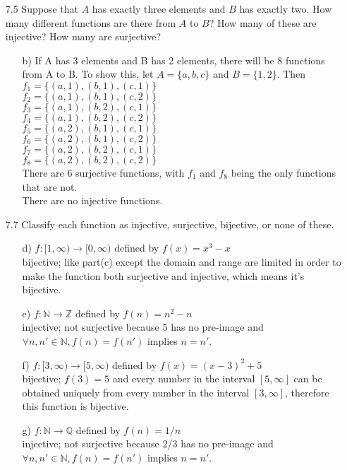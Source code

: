 \documentclass[12pt]{article}
\begin{document}
\begin{enumerate}
\item[7.5] Suppose that $A$ has exactly three elements and $B$ has exactly two. How many different functions are there from $A$ to $B$? How many of these are injective? How many are surjective?
\begin{enumerate}
\item[b)] If A has 3 elements and B has 2 elements, there will be 8 functions from A to B.
To show this, let $A = \{a, b, c\}$ and $B = \{1, 2\}$. Then \\
$f_1 = \{(a, 1), (b, 1), (c, 1)\}$ \\
$f_2 = \{(a, 1), (b, 1), (c, 2)\}$ \\
$f_3 = \{(a, 1), (b, 2), (c, 1)\}$ \\
$f_4 = \{(a, 1), (b, 2), (c, 2)\}$ \\
$f_5 = \{(a, 2), (b, 1), (c, 1)\}$ \\
$f_6 = \{(a, 2), (b, 1), (c, 2)\}$ \\
$f_7 = \{(a, 2), (b, 2), (c, 1)\}$ \\
$f_8 = \{(a, 2), (b, 2), (c, 2)\}$ \\
There are 6 surjective functions, with $f_1$ and $f_8$ being the only functions that are not. \\
There are no injective functions.
\end{enumerate}

\item[7.7] Classify each function as injective, surjective, bijective, or none of these.
\begin{enumerate}
\item[d)] $f: [1, \infty ) \rightarrow [0, \infty )$ defined by $f(x) = x^3 - x$ \\
bijective; like part(c) except the domain and range are limited in order to make the 
function both surjective and injective, which means it's bijective.
\item[e)] $f: \mathbb{N} \rightarrow \mathbb{Z}$ defined by $f(n) = n^2 - n$ \\
injective; not surjective because 5 has no pre-image and $\forall n, n' \in \mathbb{N}, f(n) = f(n')$ implies $n = n'$.
\item[f)] $f: [3, \infty ) \rightarrow [5, \infty )$ defined by $f(x) = (x - 3)^2 + 5$ \\
bijective; $f(3) = 5$ and every number in the interval $[5, \infty]$ can be obtained uniquely
from every number in the interval $[3, \infty]$, therefore this function is bijective.
\item[g)] $f: \mathbb{N} \rightarrow \mathbb{Q}$ defined by $f(n) = 1/n$ \\
injective; not surjective because 2/3 has no pre-image and $\forall n, n' \in \mathbb{N}, f(n) = f(n')$ implies $n = n'$.
\end{enumerate}


\end{enumerate}
\end{document}

